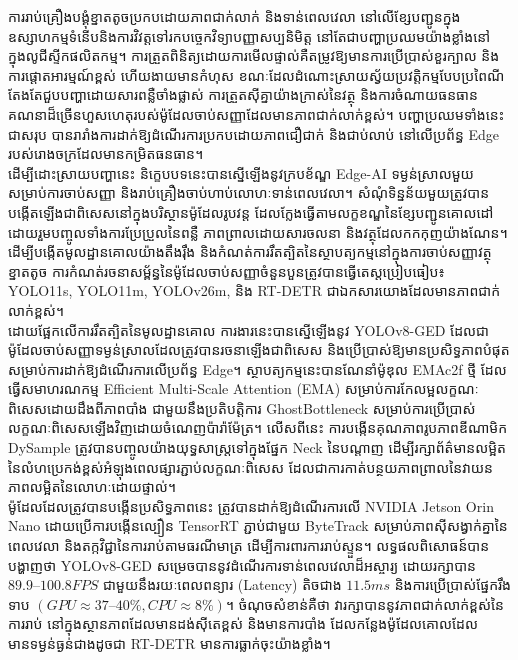 \begin{khmer}
ការរាប់គ្រឿងបង្គុំខ្នាត​​តូចប្រកបដោយភាពជាក់លាក់ និងទាន់ពេលវេលា នៅលើខ្សែបញ្ជូនក្នុងឧស្សាហកម្មទំនើបនិងការវិវត្ត​ទៅរកបច្ចេកវិទ្យាបញ្ញាសប្បនិមិត្ត នៅតែជាបញ្ហាប្រឈមយ៉ាងខ្លាំងនៅក្នុងលូជីស្ទីកផលិតកម្ម។ ការត្រួតពិនិត្យដោយការមើលផ្ទាល់គឺតម្រូវឱ្យមានការប្រើប្រាស់ខួរក្បាល និងការផ្តោតអារម្មណ៍ខ្ពស់ ហើយងាយមានកំហុស ខណៈដែលដំណោះស្រាយស្វ័យប្រវត្តិកម្មបែបប្រពៃណីតែងតែជួបបញ្ហាដោយសារពន្លឺចាំងផ្លាស់ ការត្រួតស៊ីគ្នាយ៉ាងក្រាស់នៃវត្ថុ និងការចំណាយធនធានគណនាដ៏ច្រើនហួសហេតុរបស់ម៉ូដែលចាប់សញ្ញាដែលមានភាពជាក់លាក់ខ្ពស់។ បញ្ហាប្រឈមទាំងនេះជាសរុប បានរារាំងការដាក់ឱ្យដំណើរការប្រកបដោយភាពជឿជាក់ និងជាប់លាប់ នៅលើប្រព័ន្ធ \textenglish{Edge} របស់រោងចក្រដែលមានកម្រិតធនធាន។\\

ដើម្បីដោះស្រាយបញ្ហានេះ និក្ខេបបទនេះបានស្នើឡើងនូវក្របខ័ណ្ឌ \textenglish{Edge-AI} ទម្ងន់ស្រាលមួយ សម្រាប់ការចាប់សញ្ញា និងរាប់គ្រឿងចាប់ហាប់លោហៈទាន់ពេលវេលា។ សំណុំទិន្នន័យមួយត្រូវបានបង្កើតឡើងជាពិសេសនៅក្នុងបរិស្ថានម៉ូដែលរូបវន្ត ដែលក្លែងធ្វើតាមលក្ខខណ្ឌនៃខ្សែបញ្ជូនគោលដៅ ដោយរួមបញ្ចូលទាំងការប្រែប្រួលនៃពន្លឺ ភាពព្រាលដោយសារចលនា និងវត្ថុដែលកកកុញយ៉ាងណែន។ ដើម្បីបង្កើតមូលដ្ឋានគោលយ៉ាងតឹងរ៉ឹង និងកំណត់ការរឹតត្បិតនៃស្ថាបត្យកម្មនៅក្នុងការចាប់សញ្ញាវត្ថុខ្នាតតូច ការកំណត់រចនាសម្ព័ន្ធនៃម៉ូដែលចាប់សញ្ញាចំនួនបួនត្រូវបានធ្វើតេស្តប្រៀបធៀប៖ \textenglish{YOLO11s, YOLO11m, YOLOv26m}, និង \textenglish{RT-DETR} ជាឯកសារយោងដែលមានភាពជាក់លាក់ខ្ពស់។\\

ដោយផ្អែកលើការរឹតត្បិតនៃមូលដ្ឋានគោល ការងារនេះបានស្នើឡើងនូវ \textenglish{YOLOv8-GED} ដែលជាម៉ូដែលចាប់សញ្ញាទម្ងន់ស្រាលដែលត្រូវបានរចនាឡើងជាពិសេស និងប្រើប្រាស់ឱ្យមានប្រសិទ្ធភាពបំផុតសម្រាប់ការដាក់ឱ្យដំណើរការលើប្រព័ន្ធ \textenglish{Edge}។ ស្ថាបត្យកម្មនេះបានណែនាំម៉ូឌុល \textenglish{EMAc2f} ថ្មី ដែលធ្វើសមាហរណកម្ម \textenglish{Efficient Multi-Scale Attention (EMA)} សម្រាប់ការកែលម្អលក្ខណៈពិសេសដោយដឹងពីភាពបាំង ជាមួយនឹងប្រតិបត្តិការ \textenglish{GhostBottleneck} សម្រាប់ការប្រើប្រាស់លក្ខណៈពិសេសឡើងវិញដោយចំណេញប៉ារ៉ាម៉ែត្រ។ លើសពីនេះ ការបង្កើនគុណភាពរូបភាពឌីណាមិក \textenglish{DySample} ត្រូវបានបញ្ចូលយ៉ាងយុទ្ធសាស្ត្រទៅក្នុងផ្នែក \textenglish{Neck} នៃបណ្តាញ ដើម្បីរក្សាព័ត៌មានលម្អិតនៃលំហប្រេកង់ខ្ពស់អំឡុងពេលផ្សារភ្ជាប់លក្ខណៈពិសេស ដែលជាការកាត់បន្ថយភាពព្រាលនៃវាយនភាពលម្អិតនៃលោហៈដោយផ្ទាល់។\\

ម៉ូដែលដែលត្រូវបានបង្កើនប្រសិទ្ធភាពនេះ ត្រូវបានដាក់ឱ្យដំណើរការលើ \textenglish{NVIDIA Jetson Orin Nano} ដោយប្រើការបង្កើនល្បឿន \textenglish{TensorRT} ភ្ជាប់ជាមួយ \textenglish{ByteTrack} សម្រាប់ភាពស៊ីសង្វាក់គ្នានៃពេលវេលា និងតក្កវិជ្ជានៃការរាប់តាមធរណីមាត្រ ដើម្បីការពារការរាប់ស្ទួន។ លទ្ធផលពិសោធន៍បានបង្ហាញថា \textenglish{YOLOv8-GED} សម្រេចបាននូវដំណើរការទាន់ពេលវេលាដ៏អស្ចារ្យ ដោយរក្សាបាន $89.9–100.8 FPS$ ជាមួយនឹងរយៈពេលពន្យារ (Latency) តិចជាង $11.5 ms$ និងការប្រើប្រាស់ផ្នែករឹងទាប $(GPU \approx 37–40 \%, CPU \approx 8 \%)$។ ចំណុចសំខាន់គឺថា វារក្សាបាននូវភាពជាក់លាក់ខ្ពស់នៃការរាប់ នៅក្នុងស្ថានភាពដែលមានដង់ស៊ីតេខ្ពស់ និងមានការបាំង ដែលកន្លែងម៉ូដែលគោលដែលមានទម្ងន់ធ្ងន់ជាងដូចជា \textenglish{RT-DETR} មានការធ្លាក់ចុះយ៉ាងខ្លាំង។\\


\end{khmer}
